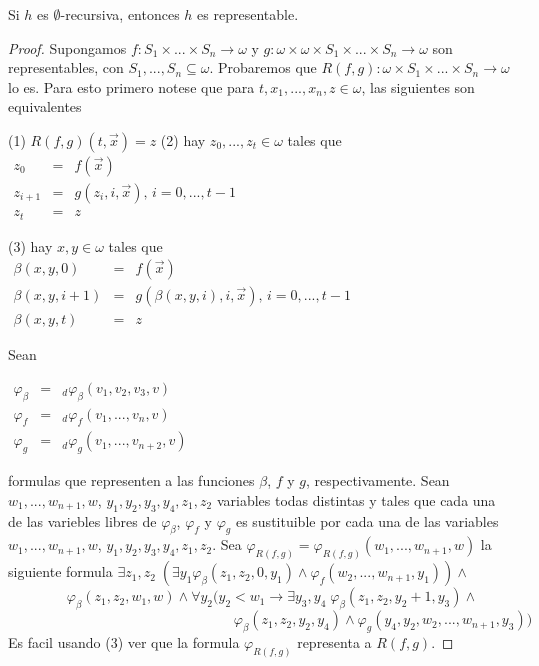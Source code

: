   \begin{proposition} \label{proposition_115}
    \PN Si $h$ es $\emptyset$-recursiva, entonces $h$ es representable.
  \end{proposition}
  \begin{proof}
    Supongamos $f:S_{1}\times ...\times S_{n}\rightarrow \omega $ y $g:\omega \times \omega \times S_{1}\times ...\times S_{n}\rightarrow \omega $ son representables, con $S_{1},...,S_{n}\subseteq \omega $. Probaremos que $ R(f,g):\omega \times S_{1}\times ...\times S_{n}\rightarrow \omega $ lo es. Para esto primero notese que para $t,x_{1},...,x_{n},z\in \omega $, las siguientes son equivalentes

    (1) $R(f,g)(t,\vec{x})=z$
    (2) hay $z_{0},...,z_{t}\in \omega $ tales que
    $\displaystyle \begin{array}{rcl} z_{0} & =& f(\vec{x}) \\ z_{i+1} & =& g(z_{i},i,\vec{x})\text{, }i=0,...,t-1 \\ z_{t} & =& z \end{array} $

    (3) hay $x,y\in \omega $ tales que
    $\displaystyle \begin{array}{rcl} \beta (x,y,0) & =& f(\vec{x}) \\ \beta (x,y,i+1) & =& g(\beta (x,y,i),i,\vec{x})\text{, }i=0,...,t-1 \\ \beta (x,y,t) & =& z \end{array} $

    Sean

    $\displaystyle \begin{array}{rcl} \varphi _{\beta } & =& _{d}\varphi _{\beta }(v_{1},v_{2},v_{3},v) \\ \varphi _{f} & =& _{d}\varphi _{f}(v_{1},...,v_{n},v) \\ \varphi _{g} & =& _{d}\varphi _{g}(v_{1},...,v_{n+2},v) \end{array} $

    formulas que representen a las funciones $\beta $, $f$ y $g$, respectivamente. Sean $w_{1},...,w_{n+1},w$, $ y_{1},y_{2},y_{3},y_{4},z_{1},z_{2}$ variables todas distintas y tales que cada una de las variebles libres de $\varphi _{\beta }$, $\varphi _{f}$ y $ \varphi _{g}$ es sustituible por cada una de las variables $ w_{1},...,w_{n+1},w$, $y_{1},y_{2},y_{3},y_{4},z_{1},z_{2}$. Sea $\varphi _{R(f,g)}=\varphi _{R(f,g)}(w_{1},...,w_{n+1},w)$ la siguiente formula
    $\exists z_{1},z_{2}\;(\exists y_{1}\varphi _{\beta }(z_{1},z_{2},0,y_{1})\wedge \varphi _{f}(w_{2},...,w_{n+1},y_{1}))\wedge $
    $\ \ \ \ \ \ \ \ \ \ \ \ \ \ \ \ \ \ \ \varphi _{\beta }(z_{1},z_{2},w_{1},w)\wedge \forall y_{2}(y_{2}< w_{1}\rightarrow \exists y_{3},y_{4}\;\varphi _{\beta }(z_{1},z_{2},y_{2}+1,y_{3})\wedge $
    $\ \ \ \ \ \ \ \ \ \ \ \ \ \ \ \ \ \ \ \ \ \ \ \ \ \ \ \ \ \ \ \ \ \ \ \ \ \ \ \ \ \ \ \ \ \ \ \ \ \ \ \ \ \ \ \ \ \ \ \ \ \ \ \ \ \ \ \ \ \ \ \ \ \varphi _{\beta }(z_{1},z_{2},y_{2},y_{4})\wedge \varphi _{g}(y_{4},y_{2},w_{2},...,w_{n+1},y_{3}))$
    Es facil usando (3) ver que la formula $\varphi _{R(f,g)}$ representa a $R(f,g)$.


\end{proof}
